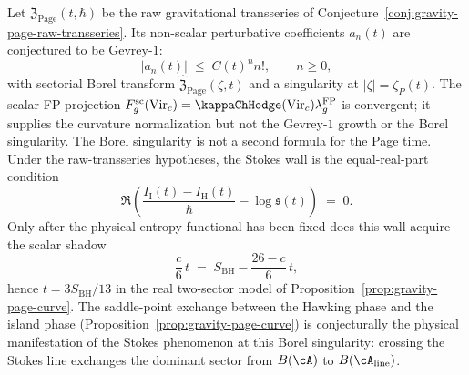 \begin{conjecture}
\label{conj:page-borel-singularity}
Let $\mathfrak Z_{\mathrm{Page}}(t,\hbar)$ be the raw
gravitational transseries of
Conjecture~\ref{conj:gravity-page-raw-transseries}. Its
non-scalar perturbative coefficients $a_n(t)$ are conjectured to be
Gevrey-$1$:
\begin{equation}\label{eq:grav-genus-borel}
|a_n(t)|
\;\le\;
C(t)^n n!,
\qquad n\ge 0,
\end{equation}
with sectorial Borel transform
$\widehat{\mathfrak Z}_{\mathrm{Page}}(\zeta,t)$ and a singularity
at $|\zeta|=\zeta_P(t)$. The scalar FP projection
$F_g^{\mathrm{sc}}(\mathrm{Vir}_c)
=\kappaChHodge(\mathrm{Vir}_c)\lambda_g^{\mathrm{FP}}$ is convergent;
it supplies the curvature normalization but not the Gevrey-$1$
growth or the Borel singularity. The Borel singularity is not a
second formula for the Page time. Under the raw-transseries
hypotheses, the Stokes wall is the equal-real-part condition
\begin{equation}\label{eq:page-stokes-wall}
\Re\!\left(
\frac{I_{\mathrm{I}}(t)-I_{\mathrm{H}}(t)}{\hbar}
-\log\mathfrak s(t)
\right)
\;=\;0.
\end{equation}
Only after the physical entropy functional has been fixed does this
wall acquire the scalar shadow
\[
\frac{c}{6}\,t
\;=\;
S_{\mathrm{BH}}-\frac{26-c}{6}\,t,
\]
hence $t=3S_{\mathrm{BH}}/13$ in the real two-sector model of
Proposition~\ref{prop:gravity-page-curve}.
The saddle-point exchange between the Hawking phase and the
island phase \textup{(}Proposition~\ref{prop:gravity-page-curve}\textup{)}
is conjecturally the physical manifestation of the Stokes
phenomenon at this Borel singularity: crossing the Stokes line
exchanges the dominant sector from $B(\cA)$ to
$B(\cA_{\mathrm{line}})$.
\end{conjecture}

